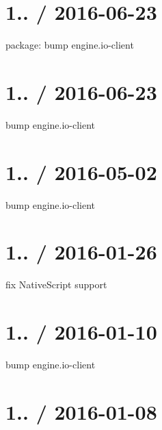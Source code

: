 \section*{1.. / 2016-\/06-\/23 }


\begin{DoxyItemize}
\item package\+: bump {\ttfamily engine.\+io-\/client}
\end{DoxyItemize}

\section*{1.. / 2016-\/06-\/23 }


\begin{DoxyItemize}
\item bump engine.\+io-\/client
\end{DoxyItemize}

\section*{1.. / 2016-\/05-\/02 }


\begin{DoxyItemize}
\item bump engine.\+io-\/client
\end{DoxyItemize}

\section*{1.. / 2016-\/01-\/26 }


\begin{DoxyItemize}
\item fix {\ttfamily Native\+Script} support
\end{DoxyItemize}

\section*{1.. / 2016-\/01-\/10 }


\begin{DoxyItemize}
\item bump {\ttfamily engine.\+io-\/client}
\end{DoxyItemize}

\section*{1.. / 2016-\/01-\/08 }


